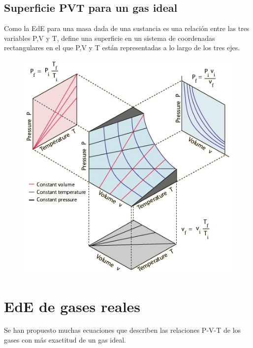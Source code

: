 \documentclass[12pt,twocolumn,a4paper]{report}
\begin{document}
\subsection*{Superficie PVT para un gas ideal}
Como la EdE para una masa dada de una sustancia es una relación entre las tres variables P,V y T, define una superficie en un sistema de coordenadas rectangulares en el que P,V y T están representadas a lo largo de los tres ejes.
\begin{figure}[H]
\includegraphics[scale=0.5]{graficos/pvt.jpeg}
\end{figure}

\section*{EdE de gases reales}
Se han propuesto muchas ecuaciones que describen las relaciones P-V-T de los gases con más exactitud de un gas ideal. 
\end{document}
